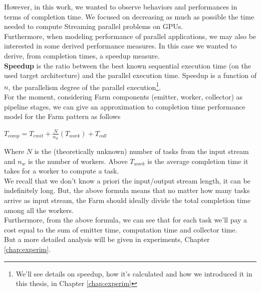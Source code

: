 	
	However, in this work, we wanted to observe behaviors and performances in terms of completion time. We focused on decreasing as much as possible the time needed to compute Streaming parallel problems on GPUs.\\
	Furthermore, when modeling performance of parallel applications, we may also be interested in some derived performance measures. In this case we wanted to derive, from completion times, a speedup measure. \\
	\textbf{Speedup} is the ratio between the best known sequential execution time (on the used target architecture) and the parallel execution time. Speedup is a function of \(n\), the parallelism degree of the parallel execution\footnote{We'll see details on speedup, how it's calculated and how we introduced it in this thesis, in Chapter \ref{chap:experim}}.\\
	For the moment, considering Farm components (emitter, worker, collector) as pipeline stages, we can give an approximation to completion time performance model for the Farm pattern as follows
	\begin{center}
		\(T_{comp} = T_{emit} + \frac{N}{n_w}( T_{work} ) + T_{coll}\)
	\end{center}
	Where \(N\) is the (theoretically unknown) number of tasks from the input stream and \(n_w\) is the number of workers.
	Above \(T_{work}\) is the average completion time it takes for a worker to compute a task.\\ 
	We recall that we don't know a priori the input/output stream length, it can be indefinitely long. But, the above formula means that no matter how many tasks arrive as input stream, the Farm should ideally divide the total completion time among all the workers.\\ 
	Furthermore, from the above formula, we can see that for each task we'll pay a cost equal to the sum of emitter time, computation time and collector time.\\
	But a more detailed analysis will be given in experiments, Chapter \ref{chap:experim}.




	


